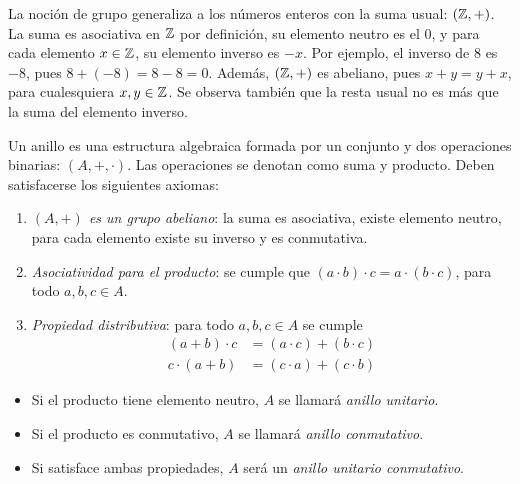 \begin{obss}
    \item La noción de grupo generaliza a los números enteros con la suma usual: $(\mathbb{Z},+)$. 
    La suma es asociativa en $\mathbb{Z}$ por definición, su elemento neutro es el $0$, y para cada elemento $x \in \mathbb{Z}$, su elemento inverso es $-x$. Por ejemplo, el inverso de $8$ es $-8$, pues $ 8 + (-8) = 8 - 8 = 0$. Además, $(\mathbb{Z},+)$ es abeliano, pues $x + y = y + x$, para cualesquiera $x,y \in \mathbb{Z}$. Se observa también que la resta usual no es más que la suma del elemento inverso.
\end{obss}




\begin{deff}[Anillo]{\cite[p.~19]{GamboaAnillos}}
     Un anillo es una estructura algebraica formada por un conjunto y dos operaciones binarias: $(A, +, \cdot)$. Las operaciones se denotan como suma y producto. Deben satisfacerse los siguientes axiomas:
     
    \begin{enumerate}[label=\roman*)]
        \item \textit{$(A, +)$ es un grupo abeliano}: la suma es asociativa, existe elemento neutro, para cada elemento existe su inverso y es conmutativa.
        \item \textit{Asociatividad para el producto}: se cumple que $ (a \cdot b) \cdot c = a \cdot (b \cdot c)$, para todo $a,b,c\in A$.
        \item \textit{Propiedad distributiva}: para todo $a,b,c\in A$ se cumple 
        \begin{align*}
            (a + b) \cdot c &= (a \cdot c) + (b \cdot c) \\
            c \cdot (a + b) &= (c \cdot a) + (c \cdot b) 
        \end{align*}
    \end{enumerate}

    \begin{itemize}
        \item Si el producto tiene elemento neutro, $A$ se llamará \textit{anillo unitario}.
        \item Si el producto es conmutativo, $A$ se llamará \textit{anillo conmutativo}.
        \item Si satisface ambas propiedades, $A$ será un \textit{anillo unitario conmutativo}.
    \end{itemize}
    
\end{deff}

